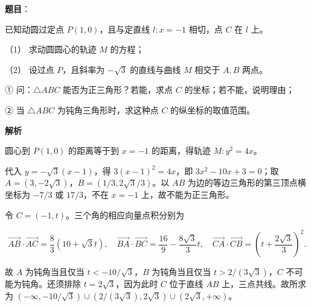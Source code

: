 \begin{answer}

\textbf{题目}：

已知动圆过定点 $P(1,0)$，且与定直线 $l:x=-1$ 相切，点 $C$ 在 $l$ 上。

（1） 求动圆圆心的轨迹 $M$ 的方程；

（2） 设过点 $P$，且斜率为 $-\sqrt3$ 的直线与曲线 $M$ 相交于 $A,B$ 两点。

① 问：$\triangle ABC$ 能否为正三角形？若能，求点 $C$ 的坐标；若不能，说明理由；

② 当 $\triangle ABC$ 为钝角三角形时，求这种点 $C$ 的纵坐标的取值范围。

\textbf{解析}


圆心到 $P(1,0)$ 的距离等于到 $x=-1$ 的距离，得轨迹 $M:y^2=4x$。


代入 $y=-\sqrt3(x-1)$，得 $3(x-1)^2=4x$，即 $3x^2-10x+3=0$；取 $A=(3,-2\sqrt3)$，$B=(1/3,2\sqrt3/3)$。以 $AB$ 为边的等边三角形的第三顶点横坐标为 $-7/3$ 或 $17/3$，不在 $x=-1$ 上，故不能为正三角形。

令 $C=(-1,t)$。三个角的相应向量点积分别为

\nopagebreak[4]
\[\overrightarrow{AB}\cdot\overrightarrow{AC}=\frac{8}{3}(10+\sqrt3 t),\quad \overrightarrow{BA}\cdot\overrightarrow{BC}=\frac{16}{9}-\frac{8\sqrt3}{3}t,\quad \overrightarrow{CA}\cdot\overrightarrow{CB}=\left(t+\frac{2\sqrt3}{3}\right)^2.\]

故 $A$ 为钝角当且仅当 $t<-10/\sqrt3$，$B$ 为钝角当且仅当 $t>2/(3\sqrt3)$，$C$ 不可能为钝角。还须排除 $t=2\sqrt3$，因为此时 $C$ 位于直线 $AB$ 上，三点共线。故所求为 $(-\infty,-10/\sqrt3)\cup(2/(3\sqrt3),2\sqrt3)\cup(2\sqrt3,+\infty)$。



\end{answer}
